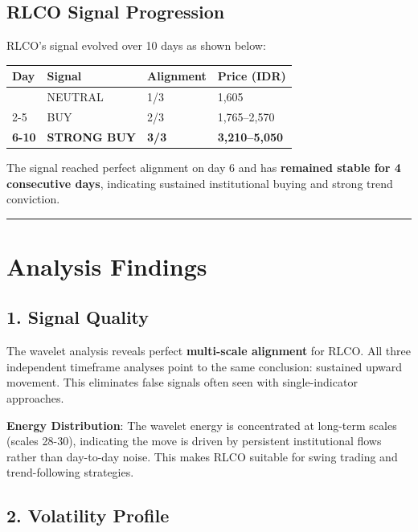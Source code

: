 \documentclass[
  11pt,
]{article}
\begin{document}
\subsection{RLCO Signal Progression}\label{rlco-signal-progression}

RLCO's signal evolved over 10 days as shown below:

\begin{longtable}[]{@{}llll@{}}
\toprule\noalign{}
Day & Signal & Alignment & Price (IDR) \\
\midrule\noalign{}
\endhead
\bottomrule\noalign{}
\endlastfoot
1 & NEUTRAL & 1/3 & 1,605 \\
2-5 & BUY & 2/3 & 1,765--2,570 \\
\textbf{6-10} & \textbf{STRONG BUY} & \textbf{3/3} &
\textbf{3,210--5,050} \\
\end{longtable}

The signal reached perfect alignment on day 6 and has \textbf{remained
stable for 4 consecutive days}, indicating sustained institutional
buying and strong trend conviction.

\begin{center}\rule{0.5\linewidth}{0.5pt}\end{center}

\section{Analysis Findings}\label{analysis-findings}

\subsection{1. Signal Quality}\label{signal-quality}

The wavelet analysis reveals perfect \textbf{multi-scale alignment} for
RLCO. All three independent timeframe analyses point to the same
conclusion: sustained upward movement. This eliminates false signals
often seen with single-indicator approaches.

\textbf{Energy Distribution}: The wavelet energy is concentrated at
long-term scales (scales 28-30), indicating the move is driven by
persistent institutional flows rather than day-to-day noise. This makes
RLCO suitable for swing trading and trend-following strategies.

\subsection{2. Volatility Profile}\label{volatility-profile}
\end{document}
